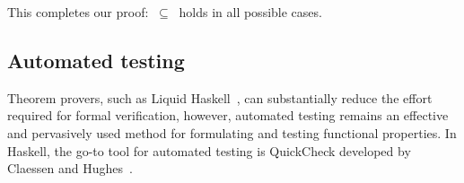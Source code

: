 \noindent
This completes our proof:  $\ \subseteq\ $ 
holds in all possible cases.

\subsection{Automated testing}\label{sub-testing}

Theorem provers, such as Liquid Haskell~\cite{2016_vazou_liquid},
can substantially reduce the effort required for formal verification,
however, automated testing remains an effective and pervasively used
method for formulating and testing functional properties. In Haskell,
the go-to tool for automated testing is QuickCheck developed by
Claessen and Hughes~\citeyear{2011_quickcheck_claessen}.

